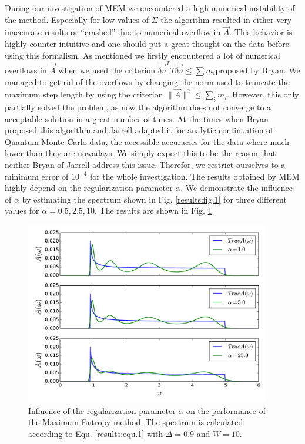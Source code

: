 During our investigation of MEM we encountered a high numerical instability of the method. Especially for low values of $\Sigma$ the algorithm resulted in either very inaccurate results or ``crashed'' due to numerical overflow in $\vec A$. This behavior is highly counter intuitive and one should put a great thought on the data before using this formalism. As mentioned we firstly encountered a lot of numerical overflows in $\vec A$ when we used the criterion $\vec{\delta u}^T T \vec{\delta u} \leq \sum m_i$proposed by Bryan. We managed to get rid of the overflows by changing the norm used to truncate the maximum step length by using the criterion $\parallel \vec A \parallel^2 \leq \sum_i m_i$. However, this only partially solved the problem, as now the algorithm does not converge to a acceptable solution in a great number of times. At the times when Bryan proposed this algorithm and Jarrell adapted it for analytic continuation of Quantum Monte Carlo data, the accessible accuracies for the data where much lower than they are nowadays. We simply expect this to be the reason that neither Bryan of Jarrell address this issue. Therefor, we restrict ourselves to a minimum error of $10^{-4}$ for the whole investigation. \newline
The results obtained by MEM highly depend on the regularization parameter $\alpha$. We demonstrate the influence of $\alpha$ by estimating the spectrum shown in Fig. \ref{results:fig.1} for three different values for $\alpha = 0.5,2.5,10$. The results are shown in Fig. \ref{results:fig.2}
\begin{figure}[htbp]
	\centering
	\includegraphics[width=0.95\textwidth]{./images/BCS_varying_alpha.pdf}
	\caption{Influence of the regularization parameter $\alpha$ on the performance of the Maximum Entropy method. The spectrum is calculated according to Equ. \ref{results:equ.1} with $\Delta = 0.9$ and $W = 10$.}
	\label{results:fig.2}
\end{figure}
